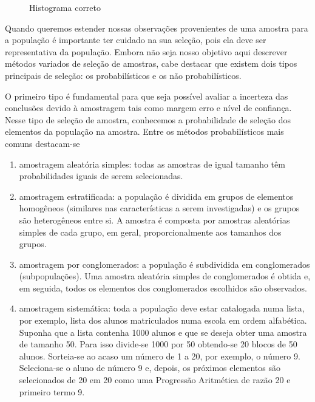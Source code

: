 \begin{figure}[H]
\centering
\capstart

\noindent{}
\caption{Histograma correto}\label{\detokenize{PE103-5:id6}}\label{\detokenize{PE103-5:id12}}\end{figure}


\label{\detokenize{PE103-A::doc}}\label{\detokenize{PE103-A:para-saber-mais}}


\label{\detokenize{PE103-A:a-questao-da-selecao-de-amostras}}\label{\detokenize{PE103-A:sec-coloque-aqui-o-nome}}
Quando queremos estender nossas observações provenientes de uma amostra para a população é importante ter cuidado na sua seleção, pois ela deve ser representativa da população. Embora não seja nosso objetivo aqui descrever métodos variados de seleção de amostras, cabe destacar que existem dois tipos principais de seleção: os probabilísticos e os não probabilísticos.

O primeiro tipo é fundamental para que seja possível avaliar a incerteza das conclusões devido à amostragem tais como margem erro e nível de confiança.  Nesse tipo de seleção de amostra, conhecemos a probabilidade de seleção dos elementos da população na amostra. Entre os métodos probabilísticos mais comuns destacam-se
\begin{enumerate}
\item {} 
amostragem aleatória simples: todas as amostras de igual tamanho têm probabilidades iguais de serem selecionadas.

\item {} 
amostragem estratificada: a população é dividida em grupos de elementos homogêneos (similares nas características a serem investigadas) e os grupos são heterogêneos entre si. A amostra é composta por amostras aleatórias simples de cada grupo, em geral, proporcionalmente aos tamanhos dos grupos.

\item {} 
amostragem por conglomerados: a população é subdividida em conglomerados (subpopulações). Uma amostra aleatória simples de conglomerados é obtida e, em seguida, todos os elementos dos conglomerados escolhidos são observados.

\item {} 
amostragem sistemática: toda a população deve estar catalogada numa lista, por exemplo, lista dos alunos matriculados numa escola em ordem alfabética. Suponha que a lista contenha 1000 alunos e que se deseja obter uma amostra de tamanho 50. Para isso divide-se 1000 por 50 obtendo-se 20 blocos de 50 alunos. Sorteia-se ao acaso um número de 1 a 20, por exemplo, o número 9. Seleciona-se o aluno de número 9 e, depois, os próximos elementos são selecionados de 20 em 20 como uma Progressão Aritmética de razão 20 e primeiro termo 9.

\end{enumerate}


